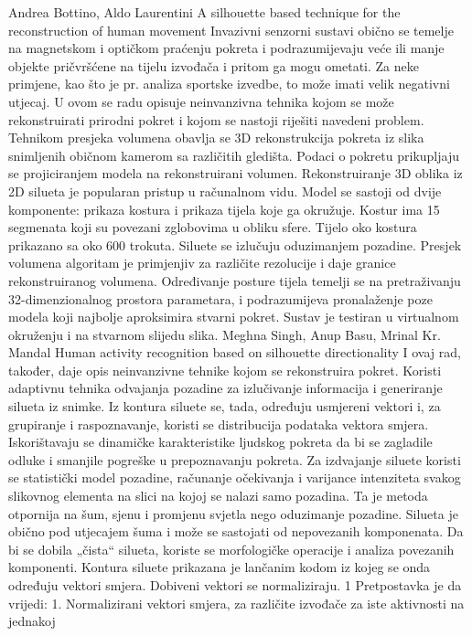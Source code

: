 \documentclass[times, utf8, diplomski]{fer}
\begin{document}
Andrea Bottino, Aldo Laurentini
A silhouette based technique for the reconstruction of human movement
Invazivni senzorni sustavi obično se temelje na magnetskom i optičkom praćenju pokreta i
podrazumijevaju veće ili manje objekte pričvršćene na tijelu izvođača i pritom ga mogu
ometati. Za neke primjene, kao što je pr. analiza sportske izvedbe, to može imati velik
negativni utjecaj. U ovom se radu opisuje neinvanzivna tehnika kojom se može rekonstruirati
prirodni pokret i kojom se nastoji riješiti navedeni problem.
Tehnikom presjeka volumena obavlja se 3D rekonstrukcija pokreta iz slika snimljenih
običnom kamerom sa različitih gledišta. Podaci o pokretu prikupljaju se projiciranjem modela
na rekonstruirani volumen.
Rekonstruiranje 3D oblika iz 2D silueta je popularan pristup u računalnom vidu. Model se
sastoji od dvije komponente: prikaza kostura i prikaza tijela koje ga okružuje. Kostur ima 15
segmenata koji su povezani zglobovima u obliku sfere. Tijelo oko kostura prikazano sa oko
600 trokuta.
Siluete se izlučuju oduzimanjem pozadine. Presjek volumena algoritam je primjenjiv za
različite rezolucije i daje granice rekonstruiranog volumena.
Određivanje posture tijela temelji se na pretraživanju 32-dimenzionalnog prostora parametara,
i podrazumijeva pronalaženje poze modela koji najbolje aproksimira stvarni pokret.
Sustav je testiran u virtualnom okruženju i na stvarnom slijedu slika.
Meghna Singh, Anup Basu, Mrinal Kr. Mandal
Human activity recognition based on silhouette directionality
I ovaj rad, također, daje opis neinvanzivne tehnike kojom se rekonstruira pokret. Koristi
adaptivnu tehnika odvajanja pozadine za izlučivanje informacija i generiranje silueta iz
snimke. Iz kontura siluete se, tada, određuju usmjereni vektori i, za grupiranje i
raspoznavanje, koristi se distribucija podataka vektora smjera. Iskorištavaju se dinamičke
karakteristike ljudskog pokreta da bi se zagladile odluke i smanjile pogreške u prepoznavanju
pokreta.
Za izdvajanje siluete koristi se statistički model pozadine, računanje očekivanja i varijance
intenziteta svakog slikovnog elementa na slici na kojoj se nalazi samo pozadina. Ta je metoda
otpornija na šum, sjenu i promjenu svjetla nego oduzimanje pozadine.
Silueta je obično pod utjecajem šuma i može se sastojati od nepovezanih komponenata. Da bi
se dobila „čista“ silueta, koriste se morfologičke operacije i analiza povezanih komponenti.
Kontura siluete prikazana je lančanim kodom iz kojeg se onda određuju vektori smjera.
Dobiveni vektori se normaliziraju.
1
Pretpostavka je da vrijedi:
1. Normalizirani vektori smjera, za različite izvođače za iste aktivnosti na jednakoj
\end{document}
